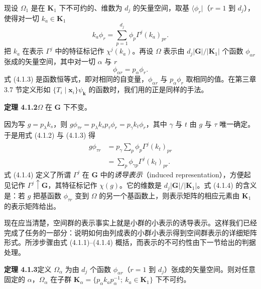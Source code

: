 现设 $\Omega_{1}$ 是在 $\mathbf{K}_{1}$ 下不可约的、维数为 $d_{j}$ 的矢量空间，取基 $\langle \phi_{r} |$（$r = 1$ 到 $d_{j}$），使得对一切 $k_{a} \in \mathbf{K}_{1}$
\begin{equation*}
k_{a}\phi_{r} = \sum^{d_{j}}_{p=1}\phi_{p}\Gamma^{j}(k_{a})_{pr}.
\tag{4.1.2}
\end{equation*}
把 $k_{a}$ 在表示 $\Gamma^{j}$ 中的特征标记作 $\chi^{j}(k_{a})$。再设 $\Omega$ 表示由 $d_{j}|\mathbf{G}|/|\mathbf{K}_{1}|$ 个函数 $\phi_{\alpha r}$ 张成的矢量空间，其中对一切 $\alpha$ 与 $r$
\begin{equation*}
\phi_{\alpha r} = p_{\alpha}\phi_{r}.
\tag{4.1.3}
\end{equation*}
式 (4.1.3) 是函数恒等式，即对相同的自变量，$\phi_{\alpha r}$ 与 $p_{\alpha}\phi_{r}$ 取相同的值。在第三章 3.7 节定义形如 $\{T_{i} \mid \mathbf{x}_{i}\}\psi_{\mathbf{k}}$ 的函数时，我们用的正是同样的手法。

\noindent\textbf{定理 4.1.2}\quad $\Omega$ 在 $\mathbf{G}$ 下不变。

因为写 $g = p_{\lambda}k_{s}$，则 $g\phi_{\tau r} = p_{\lambda}k_{s}p_{\tau}\phi_{r} = p_{\gamma}k_{t}\phi_{r}$，其中 $\gamma$ 与 $t$ 由 $g$ 与 $\tau$ 唯一确定。于是用式 (4.1.2) 与 (4.1.3) 得
\begin{equation*}
\begin{aligned}
g\phi_{\tau r} &= p_{\gamma}\sum_{p}\phi_{p}\Gamma^{j}(k_{t})_{pr}\\
&= \sum_{p}\phi_{\gamma p}\Gamma^{j}(k_{t})_{pr}.
\end{aligned}
\tag{4.1.4}
\end{equation*}
式 (4.1.4) 定义了所谓 $\Gamma^{j}$ 在 $\mathbf{G}$ 中的\textit{诱导表示}（induced representation），方便起见记作 $\Gamma^{j} \uparrow \mathbf{G}$，其特征标记作 $\chi(g)$。它的维数是 $d_{j}|\mathbf{G}|/|\mathbf{K}_{1}|$。式 (4.1.4) 的含义是：若 $g$ 把基函数 $\phi_{\tau r}$ 变到 $\Omega$ 的另一个基函数上，则表示矩阵的相应元素由 $\mathbf{K}_{1}$ 的表示矩阵给出。

现在应当清楚，空间群的表示事实上就是小群的小表示的诱导表示。这样我们已经完成了任务的一部分：说明如何由列成表的小群小表示得到空间群表示的详细矩阵形式。所涉步骤由式 (4.1.1)--(4.1.4) 概括，而表示的不可约性由下一节给出的判据处理。

\noindent\textbf{定理 4.1.3}\quad 定义 $\Omega_{\alpha}$ 为由 $d_{j}$ 个函数 $\phi_{\alpha r}$（$r = 1$ 到 $d_{j}$）张成的矢量空间。则对任意固定的 $\alpha$，$\Omega_{\alpha}$ 在子群 $\mathbf{K}_{\alpha} = \{p_{\alpha}k_{a}p^{-1}_{\alpha};\ k_{a} \in \mathbf{K}_{1}\}$ 下不可约。

